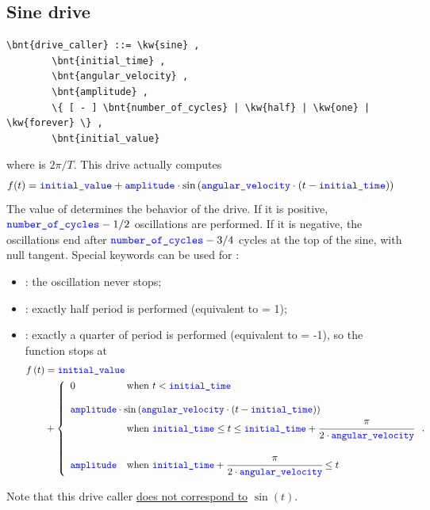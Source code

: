 \subsection{Sine drive}
\begin{Verbatim}[commandchars=\\\{\}]
    \bnt{drive_caller} ::= \kw{sine} ,
        \bnt{initial_time} ,
        \bnt{angular_velocity} ,
        \bnt{amplitude} ,
        \{ [ - ] \bnt{number_of_cycles} | \kw{half} | \kw{one} | \kw{forever} \} , 
        \bnt{initial_value}
\end{Verbatim}
where  is $2\pi/T$.
This drive actually computes
\begin{align}
	f(t)
	&=
	\textcolor{blue}{\texttt{initial\_value}}
	+
	\textcolor{blue}{\texttt{amplitude}} \cdot \sin\left( \textcolor{blue}{\texttt{angular\_velocity}} \cdot \left( t - \textcolor{blue}{\texttt{initial\_time}} \right) \right)
\end{align}
The value of  determines the behavior of the drive. 
If it is positive, $\textcolor{blue}{\texttt{number\_of\_cycles}}-1/2$ oscillations are performed. 
If it is negative, the oscillations end after 
$\textcolor{blue}{\texttt{number\_of\_cycles}}-3/4$ cycles at the top of the sine, with null
tangent.
Special keywords can be used for :
\begin{itemize}
	\item {}: the oscillation never stops;
	\item {}: exactly half period is performed (equivalent to  = 1);
	\item {}: exactly a quarter of period is performed (equivalent to  = -1),
	so the function stops at
\begin{align}
	f\plbr{t} &= \nt{initial\_value} \\
	&+ \lcubr{\matr{ll}{
		0 & \text{when } t < \nt{initial\_time} \\
		\\
		\multicolumn{2}{l}{
		\nt{amplitude} \cdot \sin\plbr{\nt{angular\_velocity} \cdot \plbr{
			t - \nt{initial\_time}
		}}
		} \\
			& \text{when } \nt{initial\_time} \le t
				\le \nt{initial\_time} + \cfrac{\pi}{2 \cdot \nt{angular\_velocity}} \\
		\\
		\nt{amplitude}
			& \text{when } \nt{initial\_time} + \cfrac{\pi}{2 \cdot \nt{angular\_velocity}} \le t
	}} \nonumber .
\end{align}
\end{itemize}
Note that this drive caller \underline{does not correspond to} $\sin(t)$. 

